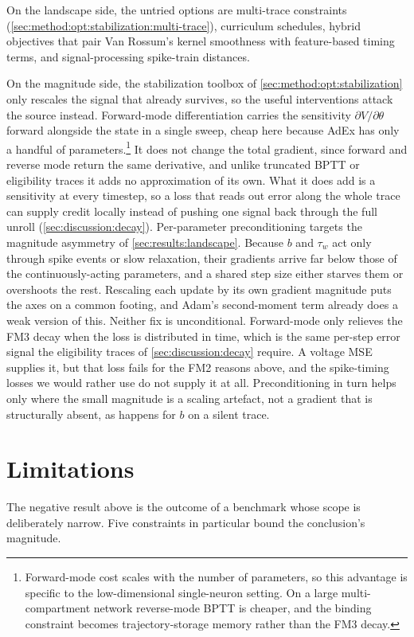 On the landscape side, the untried options are multi-trace constraints (\cref{sec:method:opt:stabilization:multi-trace}), curriculum schedules, hybrid objectives that pair Van Rossum's kernel smoothness with feature-based timing terms, and signal-processing spike-train distances.

On the magnitude side, the stabilization toolbox of \cref{sec:method:opt:stabilization} only rescales the signal that already survives, so the useful interventions attack the source instead.
Forward-mode differentiation carries the sensitivity $\partial V/\partial\theta$ forward alongside the state in a single sweep, cheap here because \gls{AdEx} has only a handful of parameters.\footnote{Forward-mode cost scales with the number of parameters, so this advantage is specific to the low-dimensional single-neuron setting. On a large multi-compartment network reverse-mode \gls{BPTT} is cheaper, and the binding constraint becomes trajectory-storage memory rather than the FM3 decay.}
It does not change the total gradient, since forward and reverse mode return the same derivative, and unlike truncated \gls{BPTT} or eligibility traces it adds no approximation of its own.
What it does add is a sensitivity at every timestep, so a loss that reads out error along the whole trace can supply credit locally instead of pushing one signal back through the full unroll (\cref{sec:discussion:decay}).
Per-parameter preconditioning targets the magnitude asymmetry of \cref{sec:results:landscape}.
Because $b$ and $\tau_w$ act only through spike events or slow relaxation, their gradients arrive far below those of the continuously-acting parameters, and a shared step size either starves them or overshoots the rest.
Rescaling each update by its own gradient magnitude puts the axes on a common footing, and Adam's second-moment term already does a weak version of this.
Neither fix is unconditional.
Forward-mode only relieves the FM3 decay when the loss is distributed in time, which is the same per-step error signal the eligibility traces of \cref{sec:discussion:decay} require.
A voltage \gls{MSE} supplies it, but that loss fails for the FM2 reasons above, and the spike-timing losses we would rather use do not supply it at all.
Preconditioning in turn helps only where the small magnitude is a scaling artefact, not a gradient that is structurally absent, as happens for $b$ on a silent trace.

\section{Limitations}\label{sec:discussion:limitations}
The negative result above is the outcome of a benchmark whose scope is deliberately narrow.
Five constraints in particular bound the conclusion's magnitude.

